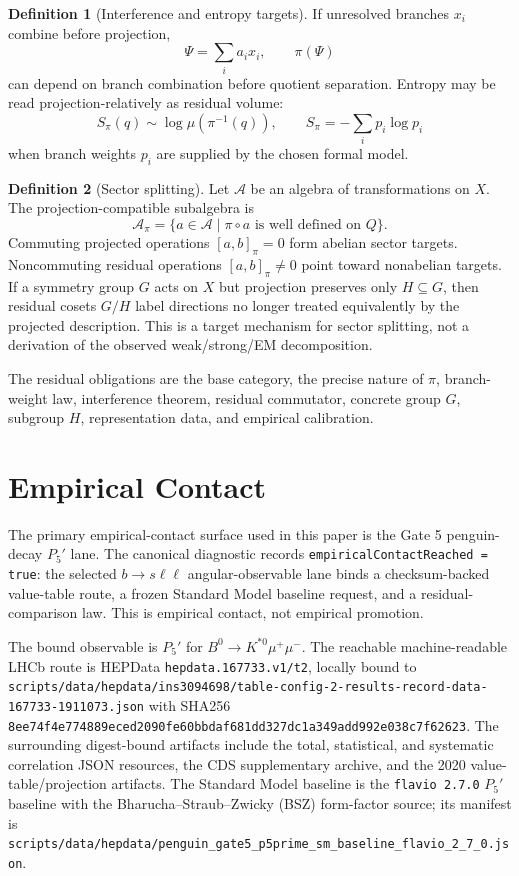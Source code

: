 \documentclass[11pt]{article}
\theoremstyle{definition}
\newtheorem{definition}{Definition}[section]
\theoremstyle{plain}
\theoremstyle{remark}
\begin{document}
\begin{definition}[Interference and entropy targets]
If unresolved branches \(x_i\) combine before projection,
\[
\Psi=\sum_i a_i x_i,
\qquad
\pi(\Psi)
\]
can depend on branch combination before quotient separation. Entropy may be
read projection-relatively as residual volume:
\[
S_\pi(q)\sim\log\mu(\pi^{-1}(q)),
\qquad
S_\pi=-\sum_i p_i\log p_i
\]
when branch weights \(p_i\) are supplied by the chosen formal model.
\end{definition}

\begin{definition}[Sector splitting]
Let \(\mathcal A\) be an algebra of transformations on \(X\). The
projection-compatible subalgebra is
\[
\mathcal A_\pi=\{a\in\mathcal A\mid \pi\circ a
\text{ is well defined on }Q\}.
\]
Commuting projected operations \([a,b]_\pi=0\) form abelian sector targets.
Noncommuting residual operations \([a,b]_\pi\neq0\) point toward nonabelian
targets. If a symmetry group \(G\) acts on \(X\) but projection preserves only
\(H\subseteq G\), then residual cosets \(G/H\) label directions no longer
treated equivalently by the projected description. This is a target mechanism
for sector splitting, not a derivation of the observed weak/strong/EM
decomposition.
\end{definition}

The residual obligations are the base category, the precise nature of \(\pi\),
branch-weight law, interference theorem, residual commutator, concrete group
\(G\), subgroup \(H\), representation data, and empirical calibration.

\section{Empirical Contact}

The primary empirical-contact surface used in this paper is the Gate 5
penguin-decay \(P_5'\) lane. The canonical diagnostic records
\texttt{empiricalContactReached = true}: the selected \(b\to s\ell\ell\)
angular-observable lane binds a checksum-backed value-table route, a frozen
Standard Model baseline request, and a residual-comparison law. This is
empirical contact, not empirical promotion.

The bound observable is \(P_5'\) for \(B^0\to K^{*0}\mu^+\mu^-\). The reachable
machine-readable LHCb route is HEPData
\texttt{hepdata.167733.v1/t2}, locally bound to
\texttt{scripts/data/hepdata/ins3094698/table-config-2-results-record-data-167733-1911073.json}
with SHA256
\texttt{8ee74f4e774889eced2090fe60bbdaf681dd327dc1a349add992e038c7f62623}.
The surrounding digest-bound artifacts include the total, statistical, and
systematic correlation JSON resources, the CDS supplementary archive, and the
2020 value-table/projection artifacts. The Standard Model baseline is the
\texttt{flavio 2.7.0} \(P_5'\) baseline with the Bharucha--Straub--Zwicky
(BSZ) form-factor source; its manifest is
\texttt{scripts/data/hepdata/penguin\_gate5\_p5prime\_sm\_baseline\_flavio\_2\_7\_0.json}.
\end{document}
